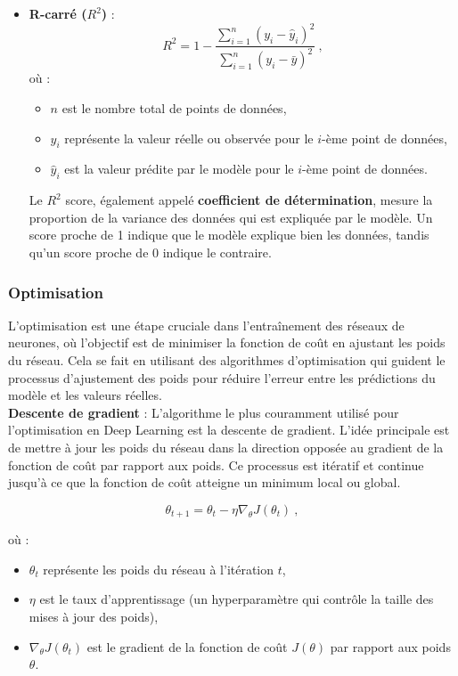 \begin{itemize}
\begin{itemize}
		\item \textbf{R-carré (\( R^2 \))} : 
		\[
		R^2 = 1 - \frac{\sum_{i=1}^{n} (y_i - \hat{y}_i)^2}{\sum_{i=1}^{n} (y_i - \bar{y})^2} ~,
		\]
		où :
		\begin{itemize}
			\item $n$ est le nombre total de points de données,
			\item $y_i$ représente la valeur réelle ou observée pour le $i$-ème point de données,
			\item $\hat{y}_i$ est la valeur prédite par le modèle pour le $i$-ème point de données.
		\end{itemize}
		Le \( R^2 \) score, également appelé \textbf{coefficient de détermination}, mesure la proportion de la variance des données qui est expliquée par le modèle. Un score proche de 1 indique que le modèle explique bien les données, tandis qu'un score proche de 0 indique le contraire.
	\end{itemize}
\end{itemize}

\subsubsection{Optimisation}

L'optimisation est une étape cruciale dans l'entraînement des réseaux de neurones, où l'objectif est de minimiser la fonction de coût en ajustant les poids du réseau. Cela se fait en utilisant des algorithmes d'optimisation qui guident le processus d'ajustement des poids pour réduire l'erreur entre les prédictions du modèle et les valeurs réelles.\\

 \textbf{Descente de gradient} :
	L'algorithme le plus couramment utilisé pour l'optimisation en Deep Learning est la descente de gradient. L'idée principale est de mettre à jour les poids du réseau dans la direction opposée au gradient de la fonction de coût par rapport aux poids. Ce processus est itératif et continue jusqu'à ce que la fonction de coût atteigne un minimum local ou global.
	
	\[
	\theta_{t+1} = \theta_t - \eta \nabla_{\theta} J(\theta_t)~,
	\]
	
	où :
	\begin{itemize}
		\item \( \theta_t \) représente les poids du réseau à l'itération \( t \),
		\item \( \eta \) est le taux d'apprentissage (un hyperparamètre qui contrôle la taille des mises à jour des poids),
		\item \( \nabla_{\theta} J(\theta_t) \) est le gradient de la fonction de coût \( J(\theta) \) par rapport aux poids \( \theta \).
	\end{itemize}


